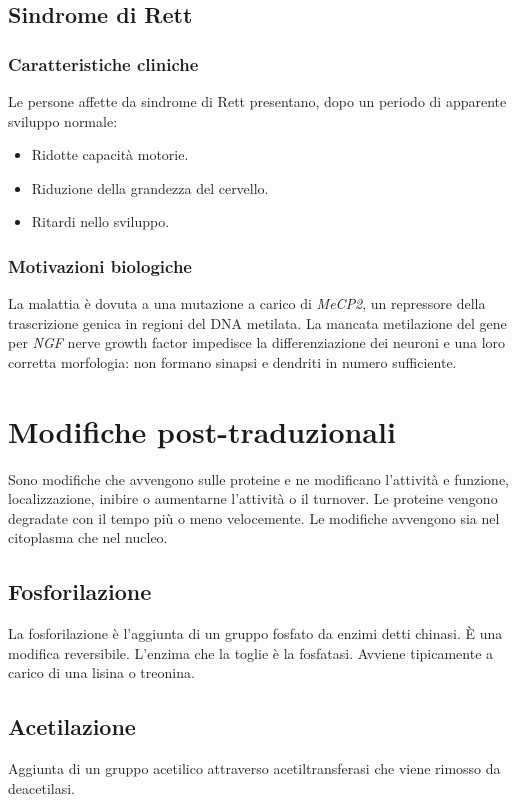 	\subsection{Sindrome di Rett}
	
		\subsubsection{Caratteristiche cliniche}
		Le persone affette da sindrome di Rett presentano, dopo un periodo di apparente sviluppo normale:
		\begin{multicols}{3}
			\begin{itemize}
				\item Ridotte capacit\`a motorie.
				\item Riduzione della grandezza del cervello.
				\item Ritardi nello sviluppo.
			\end{itemize}
		\end{multicols}

		\subsubsection{Motivazioni biologiche}
		La malattia \`e dovuta a una mutazione a carico di \emph{MeCP2}, un repressore della trascrizione genica in regioni del DNA metilata.
		La mancata metilazione del gene per \emph{NGF} nerve growth factor impedisce la differenziazione dei neuroni e una loro corretta morfologia: non formano sinapsi e dendriti in numero sufficiente.

\section{Modifiche post-traduzionali}
Sono modifiche che avvengono sulle proteine e ne modificano l'attivit\`a e funzione, localizzazione, inibire o aumentarne l'attivit\`a o il turnover. Le proteine vengono degradate con il
tempo pi\`u o meno velocemente.
Le modifiche avvengono sia nel citoplasma che nel nucleo.

	\subsection{Fosforilazione}
	La fosforilazione \`e l'aggiunta di un gruppo fosfato da enzimi detti chinasi. \`E una modifica reversibile. L'enzima che la toglie \`e la fosfatasi.
	Avviene tipicamente a carico di una lisina o treonina.

	\subsection{Acetilazione}
	Aggiunta di un gruppo acetilico attraverso acetiltransferasi che viene rimosso da deacetilasi. 

